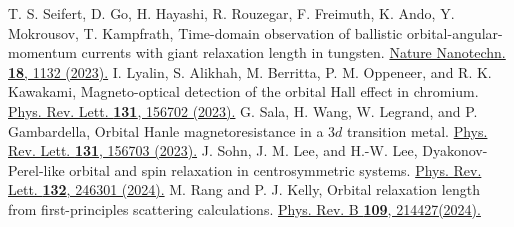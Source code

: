 \documentclass[prl,aps,twocolumn,showpacs,citeautoscript,reprint,superscriptaddress]{revtex4-1}
\newcommand{\DOI}[1]{\href{https://doi.org/#1}}
\begin{document}
\begin{thebibliography}{00}
T. S. Seifert, D. Go, H. Hayashi, R. Rouzegar, F. Freimuth, K. Ando, Y. Mokrousov, T. Kampfrath, Time-domain observation of ballistic orbital-angular-momentum currents with giant relaxation length in tungsten. \DOI{10.1038/s41565-023-01470-8}{Nature Nanotechn. {\bf 18}, 1132 (2023).}
I. Lyalin, S. Alikhah, M. Berritta, P. M. Oppeneer, and R. K. Kawakami, Magneto-optical detection of the orbital Hall effect in chromium. \DOI{10.1103/PhysRevLett.131.156702}{Phys. Rev. Lett. {\bf 131}, 156702 (2023).}
G. Sala, H. Wang, W. Legrand, and P. Gambardella, Orbital Hanle magnetoresistance in a 3$d$ transition metal. \DOI{10.1103/PhysRevLett.131.156703}{Phys. Rev. Lett. {\bf 131}, 156703 (2023).}
J. Sohn, J. M. Lee, and H.-W. Lee, Dyakonov-Perel-like orbital and spin relaxation in centrosymmetric systems. \DOI{10.1103/PhysRevLett.132.246301}{Phys. Rev. Lett. {\bf 132}, 246301 (2024).}
M. Rang and P. J. Kelly, Orbital relaxation length from first-principles scattering calculations. \DOI{10.1103/PhysRevB.109.214427}{Phys. Rev. B {\bf 109}, 214427(2024).}


\end{thebibliography}
\end{document}

